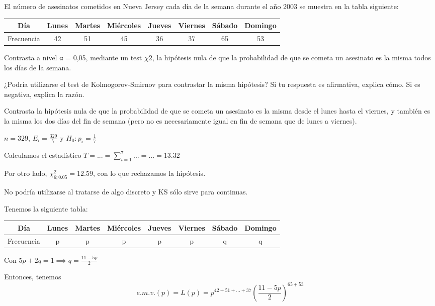 \begin{problem}[4] El número de asesinatos cometidos en Nueva Jersey cada día de la semana durante el año 2003 se muestra en la tabla siguiente:

\begin{center}
\begin{tabular}{c|ccccccc}
Día & Lunes & Martes & Miércoles & Jueves & Viernes & Sábado & Domingo \\\hline
Frecuencia & 42 & 51 & 45 & 36 & 37 & 65 & 53
\end{tabular}
\end{center}

\ppart Contrasta a nivel α = 0,05, mediante un test $χ2$, la hipótesis nula de que la probabilidad de que se cometa un asesinato es la misma todos los días de la semana.

\ppart ¿Podría utilizarse el test de Kolmogorov-Smirnov para contrastar la misma hipótesis? Si tu
respuesta es afirmativa, explica cómo. Si es negativa, explica la razón.


\ppart Contrasta la hipótesis nula de que la probabilidad de que se cometa un asesinato es la misma desde el lunes hasta el viernes, y también es la misma los dos días del fin de semana (pero no es necesariamente igual en fin de semana que de lunes a viernes).

\solution

\spart $n = 329$, $E_i = \frac{329}{7}$ y $H_0 : p_i = \frac{1}{7}$

Calculamos el estadístico $T = ... = \sum_{i=1}^7 ... = ... = 13.32$

Por otro lado, $\chi^2_{6;0.05} = 12.59$, con lo que rechazamos la hipótesis.

\spart No podría utilizarse al tratarse de algo discreto y KS sólo sirve para continuas.

\spart

Tenemos la siguiente tabla:

\begin{center}
\begin{tabular}{c|ccccccc}
Día & Lunes & Martes & Miércoles & Jueves & Viernes & Sábado & Domingo \\\hline
Frecuencia & p & p & p & p & p & q & q
\end{tabular}
\end{center}

Con $5p + 2q = 1 \implies q = \frac{11-5p}{2}$

Entonces, tenemos \[ e.m.v.(p) =L(p)= p^{42+51+...+37} \left( \frac{11-5p}{2} \right)^{65+53} \]


\end{problem}
